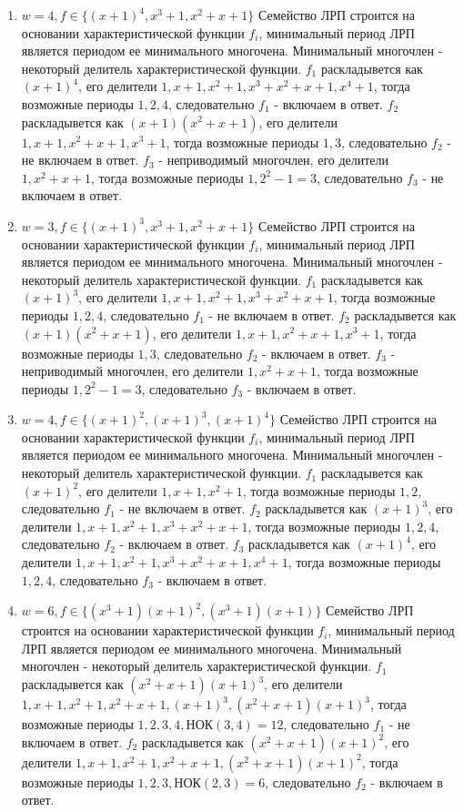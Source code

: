 \documentclass[utf8x, 14pt]{G7-32} %
\begin{document}
\begin{enumerate}
    \item $w=4, f\in \{(x+1)^4, x^3+1, x^2+x+1\}$
    Семейство ЛРП строится на основании характеристической функции $f_i$, минимальный период ЛРП является периодом ее минимального многочена. Минимальный многочлен - некоторый делитель характеристической функции. $f_1$ раскладывется как $(x+1)^4$, его делители $1, x+1, x^2+1, x^3 +x^2+x + 1, x^4 +1$, тогда возможные периоды $1, 2, 4$, следовательно $f_1$ - включаем в ответ. $f_2$ раскладывется как $(x+1)(x^2+x+1)$, его делители $1, x+1, x^2+x+1, x^3+1$, тогда возможные периоды $1, 3$, следовательно $f_2$ - не включаем в ответ. $f_3$ - неприводимый многочлен, его делители $1, x^2+x+1$, тогда возможные периоды $1, 2^2-1=3$, следовательно $f_3$ - не включаем в ответ.
    
    \item $w=3, f\in \{(x+1)^3, x^3+1, x^2+x+1\}$
    Семейство ЛРП строится на основании характеристической функции $f_i$, минимальный период ЛРП является периодом ее минимального многочена. Минимальный многочлен - некоторый делитель характеристической функции. $f_1$ раскладывется как $(x+1)^3$, его делители $1, x+1, x^2+1, x^3 +x^2+x+ 1$, тогда возможные периоды $1, 2, 4$, следовательно $f_1$ - не включаем в ответ. $f_2$ раскладывется как $(x+1)(x^2+x+1)$, его делители $1, x+1, x^2+x+1, x^3+1$, тогда возможные периоды $1, 3$, следовательно $f_2$ - включаем в ответ. $f_3$ - неприводимый многочлен, его делители $1, x^2+x+1$, тогда возможные периоды $1, 2^2-1=3$, следовательно $f_3$ - включаем в ответ.
    
    \item $w=4, f\in \{(x+1)^2, (x+1)^3, (x+1)^4\}$
    Семейство ЛРП строится на основании характеристической функции $f_i$, минимальный период ЛРП является периодом ее минимального многочена. Минимальный многочлен - некоторый делитель характеристической функции. $f_1$ раскладывется как $(x+1)^2$, его делители $1, x+1, x^2+1$, тогда возможные периоды $1, 2$, следовательно $f_1$ - не включаем в ответ. $f_2$ раскладывется как $(x+1)^3$, его делители $1, x+1, x^2+1, x^3+x^2+x+1$, тогда возможные периоды $1, 2, 4$, следовательно $f_2$ - включаем в ответ. $f_3$ раскладывется как $(x+1)^4$, его делители $1, x+1, x^2+1, x^3 +x^2+x+ 1, x^4 +1$, тогда возможные периоды $1, 2, 4$, следовательно $f_3$ - включаем в ответ.
    
    \item $w=6, f\in \{(x^3+1)(x+1)^2, (x^3+1)(x+1)\}$
    Семейство ЛРП строится на основании характеристической функции $f_i$, минимальный период ЛРП является периодом ее минимального многочена. Минимальный многочлен - некоторый делитель характеристической функции. $f_1$ раскладывется как $(x^2+x+1)(x+1)^3$, его делители $1, x+1, x^2+1, x^2+x+1, (x+1)^3, (x^2+x+1)(x+1)^3$, тогда возможные периоды $1, 2, 3, 4, $НОК$(3,4)=12$, следовательно $f_1$ - не включаем в ответ. $f_2$ раскладывется как $(x^2+x+1)(x+1)^2$, его делители $1, x+1, x^2+1, x^2+x+1, (x^2+x+1)(x+1)^2$, тогда возможные периоды $1, 2, 3, $НОК$(2,3)=6$, следовательно $f_2$ - включаем в ответ.
    

\end{enumerate}
\end{document}
